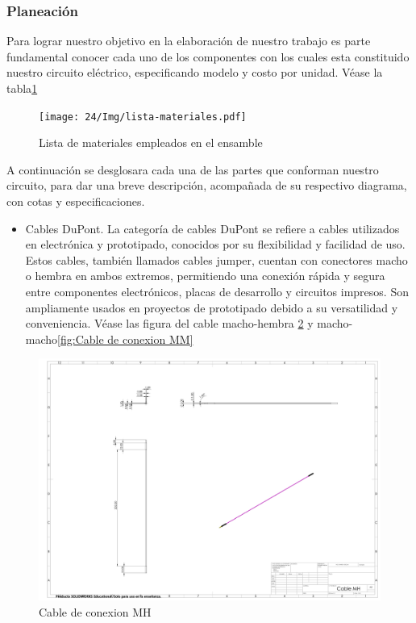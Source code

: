     \subsubsection{Planeación}
    Para lograr nuestro objetivo en la elaboración de nuestro trabajo es parte fundamental conocer cada uno de los componentes con los cuales esta constituido nuestro circuito eléctrico, especificando modelo y costo por unidad. Véase la tabla\ref{fig:lista-materiales}
    \begin{figure}[H]
        \centering
    \texttt{[image: 24/Img/lista-materiales.pdf]}
        \caption{Lista de materiales empleados en el ensamble}
        \label{fig:lista-materiales}
    \end{figure}
    A continuación se desglosara cada una de las partes que conforman nuestro circuito, para dar una breve descripción, acompañada de su respectivo diagrama, con cotas y especificaciones. 
    \begin{itemize}
        \item Cables DuPont. 
        La categoría de cables DuPont se refiere a cables utilizados en electrónica y prototipado, conocidos por su flexibilidad y facilidad de uso. Estos cables, también llamados cables jumper, cuentan con conectores macho o hembra en ambos extremos, permitiendo una conexión rápida y segura entre componentes electrónicos, placas de desarrollo y circuitos impresos. Son ampliamente usados en proyectos de prototipado debido a su versatilidad y conveniencia. Véase las figura del cable macho-hembra \ref{fig:Cable de conexion MH} y macho-macho\ref{fig:Cable de conexion MM}
    \end{itemize}
        \begin{figure}[H]
        \centering
    \includegraphics[scale=0.125]{24/Img/cabledeConexionmh.PDF}
        \caption{Cable de conexion MH}
        \label{fig:Cable de conexion MH}
    \end{figure}
